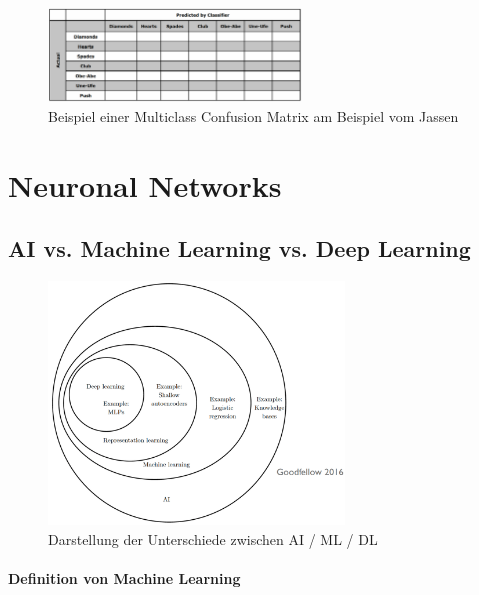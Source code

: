 \documentclass[a4paper]{article}
\begin{document}
		\begin{figure}[htb!]
			\centering
			\includegraphics[width=0.6\textwidth]{img/04_supervised_ml/multiclass_confusion_matrix.png}
			\caption{Beispiel einer Multiclass Confusion Matrix am Beispiel vom Jassen}
			\label{fig:04_superv_ml_multiclass_confusion_matrix}
		\end{figure}
	
	\section{Neuronal Networks}
	
		\subsection{AI vs. Machine Learning vs. Deep Learning}
		
		\begin{figure}[htb!]
			\centering
			\includegraphics[width=0.7\textwidth]{img/05_neuronal_networks/ai_ml_dl.png}
			\caption{Darstellung der Unterschiede zwischen AI / ML / DL}
			\label{fig:05_neuronet_ai_ml_dl}
		\end{figure}
	
		\newpage
		
		\paragraph{Definition von Machine Learning}
		
\end{document}
